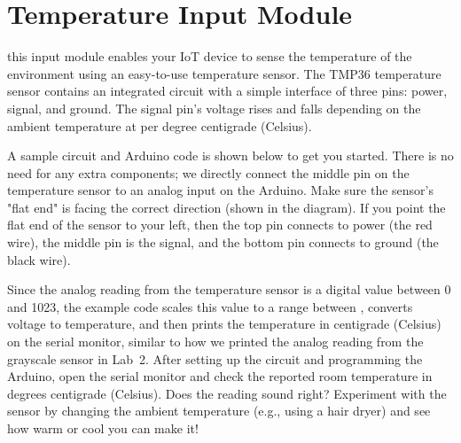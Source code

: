 
\clearpage
\section{Temperature Input Module}
\label{sec-input-temperature}


this input module enables your IoT device to sense the temperature of
the environment using an easy-to-use temperature sensor. The TMP36
temperature sensor contains an integrated circuit with a simple
interface of three pins: power, signal, and ground. The signal pin's
voltage rises and falls depending on the ambient temperature at
 per degree centigrade (Celsius).

A sample circuit and Arduino code is shown below to get you started.
There is no need for any extra components; we directly connect the
middle pin on the temperature sensor to an analog input on the Arduino.
Make sure the sensor's "flat end" is facing the correct direction (shown
in the diagram). If you point the flat end of the sensor to your left,
then the top pin connects to power (the red wire), the middle pin is the
signal, and the bottom pin connects to ground (the black wire).

Since the analog reading from the temperature sensor is a digital value
between 0 and 1023, the example code scales this value to a range
between , converts voltage to temperature, and then prints
the temperature in centigrade (Celsius) on the serial monitor, similar
to how we printed the analog reading from the grayscale sensor in Lab~2.
After setting up the circuit and programming the Arduino, open the
serial monitor and check the reported room temperature in degrees
centigrade (Celsius). Does the reading sound right? Experiment with the
sensor by changing the ambient temperature (e.g., using a hair dryer)
and see how warm or cool you can make it!

